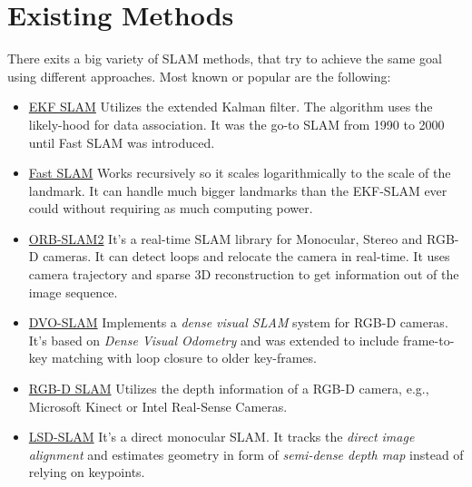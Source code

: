 \section{Existing Methods}
There exits a big variety of SLAM methods, that try to achieve the same goal using different approaches\cite{openslam}.
Most known or popular are the following:
\begin{itemize}
    \item \underline{EKF SLAM} \newline
    Utilizes the extended Kalman filter. The algorithm  uses the likely-hood for data association.
    It was the go-to SLAM from 1990 to 2000 until Fast SLAM was introduced. \cite{Fastslam}
    
    \item \underline{Fast SLAM} \newline
    Works recursively  so it scales logarithmically to the scale of the landmark. It can handle much bigger landmarks than the EKF-SLAM ever could without requiring as much computing power. \cite{Fastslam}
    
    \item \underline{ORB-SLAM2} \newline
    It's a real-time SLAM library for Monocular, Stereo and RGB-D cameras. It can detect loops and relocate the camera in real-time. It uses camera trajectory and sparse 3D reconstruction to get information out of the image sequence.\cite{orbslam}
    
    \item \underline{DVO-SLAM} \newline
    Implements a \textit{dense visual SLAM} system for RGB-D cameras. It's based on \textit{Dense Visual Odometry} and was extended to include frame-to-key matching with loop closure to older key-frames. \cite{dvoslam}
    
    \item \underline{RGB-D SLAM} \newline
    Utilizes the depth information of a RGB-D camera, e.g., Microsoft Kinect or Intel Real-Sense Cameras.\cite{rosrgbdslam}
    
    \item \underline{LSD-SLAM} \newline
    It's a direct monocular SLAM. It tracks the \textit{direct image alignment} and estimates geometry in form of \textit{semi-dense depth map} instead of relying on keypoints.\cite{lsdslam}
\end{itemize}